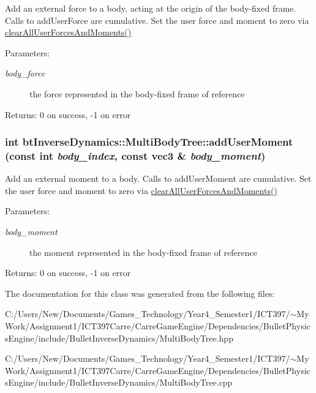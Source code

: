 Add an external force to a body, acting at the origin of the body-fixed frame. Calls to addUserForce are cumulative. Set the user force and moment to zero via \hyperlink{classbt_inverse_dynamics_1_1_multi_body_tree_66402f51ab131c39a4d309196ff7c743}{clearAllUserForcesAndMoments()} \begin{Desc}
\item[Parameters:]
\begin{description}
\item[{\em body\_\-force}]the force represented in the body-fixed frame of reference \end{description}
\end{Desc}
\begin{Desc}
\item[Returns:]0 on success, -1 on error \end{Desc}
\hypertarget{classbt_inverse_dynamics_1_1_multi_body_tree_63096d466e1def1657da8eb3a99850fa}{
\subsubsection[addUserMoment]{\setlength{\rightskip}{0pt plus 5cm}int btInverseDynamics::MultiBodyTree::addUserMoment (const int {\em body\_\-index}, \/  const {\bf vec3} \& {\em body\_\-moment})}}
\label{classbt_inverse_dynamics_1_1_multi_body_tree_63096d466e1def1657da8eb3a99850fa}


Add an external moment to a body. Calls to addUserMoment are cumulative. Set the user force and moment to zero via \hyperlink{classbt_inverse_dynamics_1_1_multi_body_tree_66402f51ab131c39a4d309196ff7c743}{clearAllUserForcesAndMoments()} \begin{Desc}
\item[Parameters:]
\begin{description}
\item[{\em body\_\-moment}]the moment represented in the body-fixed frame of reference \end{description}
\end{Desc}
\begin{Desc}
\item[Returns:]0 on success, -1 on error \end{Desc}


The documentation for this class was generated from the following files:\begin{CompactItemize}
\item 
C:/Users/New/Documents/Games\_\-Technology/Year4\_\-Semester1/ICT397/$\sim$My Work/Assignment1/ICT397Carre/CarreGameEngine/Dependencies/BulletPhysicsEngine/include/BulletInverseDynamics/MultiBodyTree.hpp\item 
C:/Users/New/Documents/Games\_\-Technology/Year4\_\-Semester1/ICT397/$\sim$My Work/Assignment1/ICT397Carre/CarreGameEngine/Dependencies/BulletPhysicsEngine/include/BulletInverseDynamics/MultiBodyTree.cpp\end{CompactItemize}
